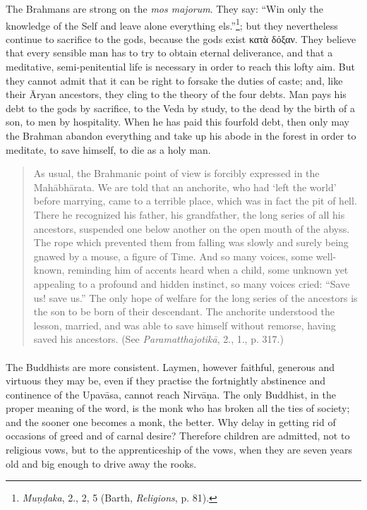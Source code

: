 \documentclass[a4paper, 11pt, oneside, english, landscape]{article}
\begin{document}
The Brahmans are strong on the \emph{mos majorum}. They say: ``Win only the knowledge of the Self and leave alone everything els.''\footnote{\emph{Muṇḍaka}, 2., 2, 5 (Barth, \emph{Religions}, p. 81).}; but they nevertheless continue to sacrifice to the gods, because the gods exist κατὰ δόξαν. They believe that every sensible man has to try to obtain eternal deliverance, and that a meditative, semi-penitential life is necessary in order to reach this lofty aim. But they cannot admit that it can be right to forsake the duties of caste; and, like their Āryan ancestors, they cling to the theory of the four debts. Man pays his debt to the gods by sacrifice, to the Veda by study, to the dead by the birth of a son, to men by hospitality. When he has paid this fourfold debt, then only may the Brahman abandon everything and take up his abode in the forest in order to meditate, to save himself, to die as a holy man.
\begin{quotation}
\small
As usual, the Brahmanic point of view is forcibly expressed in the Mahābhārata. We are told that an anchorite, who had `left the world' before marrying, came to a terrible place, which was in fact the pit of hell. There he recognized his father, his grandfather, the long series of all his ancestors, suspended one below another on the open mouth of the abyss. The rope which prevented them from falling was slowly and surely being gnawed by a mouse, a figure of Time. And so many voices, some well-known, reminding him of accents heard when a child, some unknown yet appealing to a profound and hidden instinct, so many voices cried: ``Save us! save us.'' The only hope of welfare for the long series of the ancestors is the son to be born of their descendant. The anchorite understood the lesson, married, and was able to save himself without remorse, having saved his ancestors. (See \emph{Paramatthajotikā}, 2., 1., p. 317.)
\end{quotation}
\paragraph{}
The Buddhists are more consistent. Laymen, however faithful, generous and virtuous they may be, even if they practise the fortnightly abstinence and continence of the Upavāsa, cannot reach Nirvāṇa. The only Buddhist, in the proper meaning of the word, is the monk who has broken all the ties of society; and the sooner one becomes a monk, the better. Why delay in getting rid of occasions of greed and of carnal desire? Therefore children are admitted, not to religious vows, but to the apprenticeship of the vows, when they are seven years old and big enough to drive away the rooks.
\end{document}
